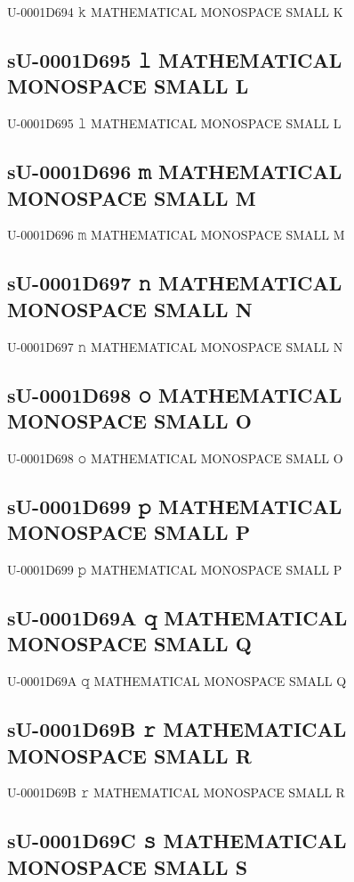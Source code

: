 U-0001D694 𝚔 MATHEMATICAL MONOSPACE SMALL K

\subsection{sU-0001D695 𝚕 MATHEMATICAL MONOSPACE SMALL L}

U-0001D695 𝚕 MATHEMATICAL MONOSPACE SMALL L

\subsection{sU-0001D696 𝚖 MATHEMATICAL MONOSPACE SMALL M}

U-0001D696 𝚖 MATHEMATICAL MONOSPACE SMALL M

\subsection{sU-0001D697 𝚗 MATHEMATICAL MONOSPACE SMALL N}

U-0001D697 𝚗 MATHEMATICAL MONOSPACE SMALL N

\subsection{sU-0001D698 𝚘 MATHEMATICAL MONOSPACE SMALL O}

U-0001D698 𝚘 MATHEMATICAL MONOSPACE SMALL O

\subsection{sU-0001D699 𝚙 MATHEMATICAL MONOSPACE SMALL P}

U-0001D699 𝚙 MATHEMATICAL MONOSPACE SMALL P

\subsection{sU-0001D69A 𝚚 MATHEMATICAL MONOSPACE SMALL Q}

U-0001D69A 𝚚 MATHEMATICAL MONOSPACE SMALL Q

\subsection{sU-0001D69B 𝚛 MATHEMATICAL MONOSPACE SMALL R}

U-0001D69B 𝚛 MATHEMATICAL MONOSPACE SMALL R

\subsection{sU-0001D69C 𝚜 MATHEMATICAL MONOSPACE SMALL S}

